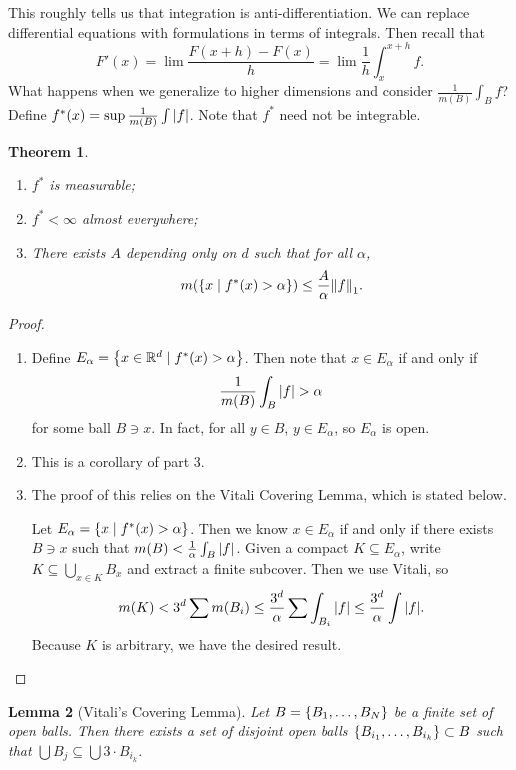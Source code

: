 \documentclass[leqno, openany]{memoir}
\newtheorem{thm}{Theorem}[chapter]
\newtheorem{lem}[thm]{Lemma}
\theoremstyle{definition}
\theoremstyle{remark}
\theoremstyle{plain}
\theoremstyle{definition}
\theoremstyle{remark}
\newcommand{\R}{\mathbb{R}}
\begin{document}
This roughly tells us that integration is anti-differentiation. We can replace differential equations with formulations in terms of integrals. Then recall that
\[ F'(x) = \lim \frac{F(x+h) - F(x)}{h} = \lim \frac{1}{h} \int_x^{x+h} f. \]
What happens when we generalize to higher dimensions and consider $\frac{1}{m(B)} \int_B f$? Define $f^*(x) = \sup \frac{1}{m(B)} \int \abs{f}$. Note that $f^*$ need not be integrable.

\begin{thm}
    \begin{enumerate}
        \item $f^*$ is measurable;
        \item $f^* < \infty$ almost everywhere;
        \item There exists $A$ depending only on $d$ such that for all $\alpha$,
            \[ m \qty(\qty{x \mid f^*(x) > \alpha}) \leq \frac{A}{\alpha} \norm{f}_1. \]
    \end{enumerate}
\end{thm}

\begin{proof}
    \begin{enumerate}
        \item Define $E_{\alpha} = \qty{x \in \R^d \mid f^*(x) > \alpha}$. Then note that $x \in E_{\alpha}$ if and only if 
            \[ \frac{1}{m(B)} \int_B \abs{f} > \alpha \]
            for some ball $B \ni x$. In fact, for all $y \in B$, $y \in E_{\alpha}$, so $E_{\alpha}$ is open.
        \item This is a corollary of part 3.
        \item The proof of this relies on the Vitali Covering Lemma, which is stated below.
            
            Let $E_{\alpha} = \qty{x \mid f^*(x) > \alpha}$. Then we know $x \in E_{\alpha}$ if and only if there exists $B \ni x$ such that $m(B) < \frac{1}{\alpha} \int_B \abs{f}$. Given a compact $K \subseteq E_{\alpha}$, write $K \subseteq \bigcup_{x \in K} B_x$ and extract a finite subcover. Then we use Vitali, so
            \[ m(K) < 3^d \sum m(B_{i}) \leq \frac{3^d}{\alpha} \sum \int_{B_{i}} \abs{f} \leq \frac{3^d}{\alpha} \int \abs{f}. \]
            Because $K$ is arbitrary, we have the desired result.
    \end{enumerate}
\end{proof}

\begin{lem}[Vitali's Covering Lemma]
    Let $B = \qty{B_1, \ldots, B_N}$ be a finite set of open balls. Then there exists a set of disjoint open balls $\qty{B_{i_1}, \ldots, B_{i_k}} \subset B$ such that $\bigcup B_j \subseteq \bigcup 3 \cdot B_{i_k}$.
\end{lem}
\end{document}
